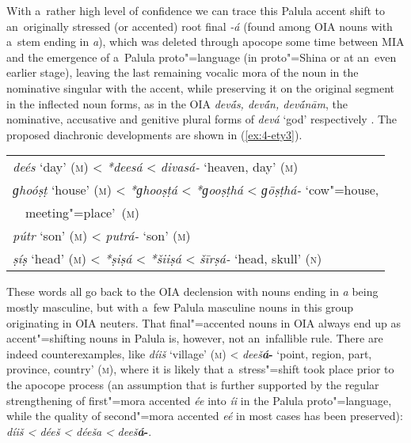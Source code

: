 With a~rather high level of confidence we can trace this Palula accent shift to an~originally stressed (or accented) root final \textit{-á} (found among OIA nouns with a~stem ending in \textit{a}), which was deleted through apocope some time between MIA \citep[247--248]{pischel2011} and the emergence of a~Palula proto"=language (in proto"=Shina or at an~even earlier stage), leaving the last remaining vocalic mora of the noun in the nominative singular with the accent, while preserving it on the original segment in the inflected noun forms, as in the OIA \textit{dev\'{\={a}}s, dev\'{\={a}}n, dev\'{\={a}}nām}, the nominative, accusative and genitive plural forms of \textit{devá} `god' respectively \citep[330]{whitney1960}. The proposed diachronic developments are shown in (\ref{ex:4-ety3}). 

\begin{exe}
\extab
\label{ex:4-ety3}
\begin{tabular}{ l }
\textit{deés} `day' (\textsc{m}) {\textless} \textit{*deesá} {\textless} \textit{divasá-} `heaven, day' (\textsc{m})\\
\textit{ɡhoóṣṭ} `house' (\textsc{m}) {\textless} \textit{*ɡhooṣṭá} {\textless} \textit{*ɡooṣṭhá} {\textless} \textit{ɡōṣṭhá-} `cow"=house, \\
~~meeting"=place'~(\textsc{m})\\
\textit{pútr} `son' (\textsc{m}) {\textless} \textit{putrá-} `son' (\textsc{m})\\
\textit{ṣíṣ} `head' (\textsc{m}) {\textless} \textit{*ṣiṣá} {\textless} \textit{*šiiṣá} {\textless} \textit{šīrṣá-} `head, skull' (\textsc{n})
\end{tabular}
\end{exe}

These words all go back to the OIA declension with nouns ending in \textit{a} being mostly masculine, but with a~few Palula masculine nouns in this group originating in OIA neuters. That final"=accented nouns in OIA always end up as accent"=shifting nouns in Palula is, however, not an~infallible rule. There are indeed counterexamples, like \textit{díiš} `village' (\textsc{m}) {\textless} \textit{deeš}\textbf{\textit{á}-} `point, region, part, province, country' (\textsc{m}), where it is likely that a~stress"=shift took place prior to the apocope process (an assumption that is further supported by the regular strengthening of first"=mora accented \textit{ée} into \textit{íi} in the Palula proto"=language, while the quality of second"=mora accented \textit{eé} in most cases has been preserved): \textit{díiš {\textless} déeš} \textit{{\textless} déeša} \textit{{\textless}} \textit{deeš}\textbf{\textit{á}-}. 


